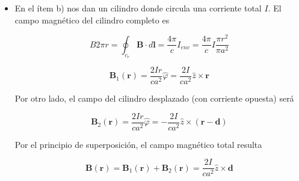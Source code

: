 \begin{itemize}
\item En el \'item b) nos dan un cilindro donde circula una corriente total $I$. El campo magn\'etico del cilindro completo es

$$B2\pi r = \oint_{c_{r}} \mathbf{B} \cdot d\mathbf{l} = \frac{4\pi}{c}I_{enc} = \frac{4\pi}{c}I \frac{\pi r^{2}}{\pi a^{2}}$$

$$\mathbf{B}_{1}(\mathbf{r}) = \frac{2Ir}{ca^{2}}\hat{\varphi} = \frac{2I}{ca^{2}} \hat{z} \times \mathbf{r}$$

Por otro lado, el campo del cilindro desplazado (con corriente opuesta) ser\'a

$$\mathbf{B}_{2}(\mathbf{r}) = \frac{2Ir}{ca^{2}}\hat{\varphi} = -\frac{2I}{ca^{2}} \hat{z} \times (\mathbf{r - d})$$

Por el principio de superposici\'on, el campo magn\'etico total resulta

$$\mathbf{B(r)} = \mathbf{B}_{1}(\mathbf{r}) + \mathbf{B}_{2}(\mathbf{r}) = \frac{2I}{ca^{2}} \hat{z} \times \mathbf{d}$$

\end{itemize}

\subsection{}

